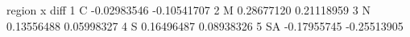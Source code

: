 \begin{Schunk}
\begin{Soutput}
  region           x        diff
1      C -0.02983546 -0.10541707
2      M  0.28677120  0.21118959
3      N  0.13556488  0.05998327
4      S  0.16496487  0.08938326
5     SA -0.17955745 -0.25513905
\end{Soutput}
\end{Schunk}
